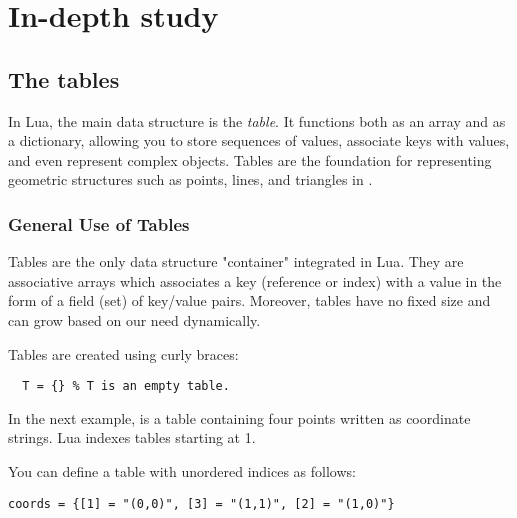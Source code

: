 \newpage

\section{In-depth study}
\label{sec:in_depth_study}

\subsection{The tables}

In Lua, the main data structure is the \emph{table}. It functions both as an array and as a dictionary, allowing you to store sequences of values, associate keys with values, and even represent complex objects. Tables are the foundation for representing geometric structures such as points, lines, and triangles in .

\subsubsection{General Use of Tables}

Tables are the only data structure "container" integrated in Lua.
 They are associative arrays  which associates a key (reference or index) with a value in the form of a field (set) of key/value pairs. Moreover, tables have no fixed size and can grow based on our need dynamically.

Tables are created using curly braces:

\begin{mybox}
\begin{verbatim}
  T = {} % T is an empty table.
\end{verbatim}
\end{mybox}

In the next example,  is a table containing four points written as coordinate strings. Lua indexes tables starting at 1.

\begin{tkzexample}[latex=0.35\textwidth]
\end{tkzexample}

You can define a table with unordered indices as follows:

\begin{mybox}
\begin{verbatim}
coords = {[1] = "(0,0)", [3] = "(1,1)", [2] = "(1,0)"}
\end{verbatim}
\end{mybox}

